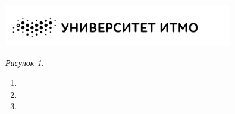 \hypertarget{schema1}{}

\begin{center}
    \includegraphics[width=10cm]{images/logo}

    \smallvspace

    \textit{Рисунок 1.} 
\end{center}

\begin{enumerate}
    \item {}
    \item {}
    \item {}
\end{enumerate}




